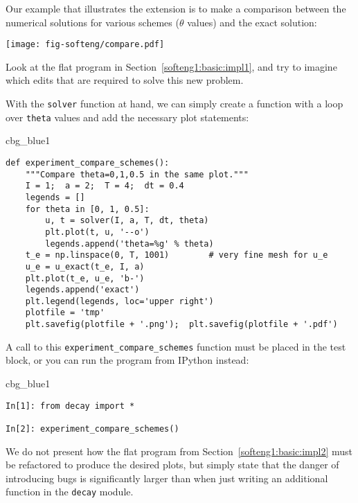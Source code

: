 \documentclass[graybox,sectrefs,envcountresetchap,open=right,final]{svmonodo}
\newenvironment{_cod_tight}[1]{
   \def\FrameCommand{\colorbox{#1}}
   \FrameRule0.6pt\MakeFramed {\FrameRestore}\vskip3mm}
   {\vskip0mm\endMakeFramed}
\newenvironment{cod}[1]{
\bgroup\rmfamily
\fboxsep=0mm\relax
\begin{_cod_tight}{#1}
\list{}{\parsep=-2mm\parskip=0mm\topsep=0pt\leftmargin=2mm
\rightmargin=2\leftmargin\leftmargin=4pt\relax}
\item\relax}
{\endlist\end{_cod_tight}\egroup}
\newenvironment{question_mdfboxadmon}[1][]{
\begin{question_mdfboxmdframed}[frametitle=#1]
}
{
\end{question_mdfboxmdframed}
}
\begin{document}
Our example that illustrates the extension
is to make a comparison between the numerical solutions
for various schemes ($\theta$ values) and the exact solution:



\centerline{\texttt{[image: fig-softeng/compare.pdf]}}




\begin{question_mdfboxadmon}
Look at the flat program in
Section~\ref{softeng1:basic:impl1},
and try to imagine which edits that are required to solve this new problem.
\end{question_mdfboxadmon}



With the \texttt{solver} function at hand, we can simply create a function
with a loop over \texttt{theta} values and add the necessary plot statements:

\begin{cod}{cbg_blue1}\begin{Verbatim}[numbers=none,fontsize=\fontsize{9pt}{9pt},baselinestretch=0.95,xleftmargin=2mm]
def experiment_compare_schemes():
    """Compare theta=0,1,0.5 in the same plot."""
    I = 1;  a = 2;  T = 4;  dt = 0.4
    legends = []
    for theta in [0, 1, 0.5]:
        u, t = solver(I, a, T, dt, theta)
        plt.plot(t, u, '--o')
        legends.append('theta=%g' % theta)
    t_e = np.linspace(0, T, 1001)        # very fine mesh for u_e
    u_e = u_exact(t_e, I, a)
    plt.plot(t_e, u_e, 'b-')
    legends.append('exact')
    plt.legend(legends, loc='upper right')
    plotfile = 'tmp'
    plt.savefig(plotfile + '.png');  plt.savefig(plotfile + '.pdf')
\end{Verbatim}
\end{cod}
\noindent

A call to this \Verb!experiment_compare_schemes! function must be placed
in the test block, or you can run the program from IPython instead:

\begin{cod}{cbg_blue1}\begin{Verbatim}[numbers=none,fontsize=\fontsize{9pt}{9pt},baselinestretch=0.95,xleftmargin=2mm]
In[1]: from decay import *

In[2]: experiment_compare_schemes()
\end{Verbatim}
\end{cod}
\noindent

We do not present how the flat program from
Section~\ref{softeng1:basic:impl2} must be refactored to produce the
desired plots, but simply state that the danger of introducing bugs
is significantly larger than when just writing an additional function
in the \texttt{decay} module.
\end{document}
